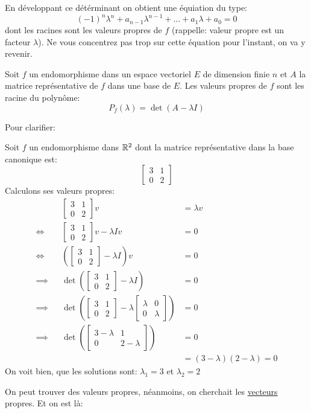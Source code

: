 En développant ce détérminant on obtient une équiation du type:
\[
    (-1)^n\lambda^n + a_{n-1}\lambda^{n-1} + \ldots + a_1\lambda + a_0 = 0
\] 
dont les racines sont les valeurs propres de $f$ (rappelle: valeur propre est un facteur $\lambda$).
Ne vous concentrez pas trop sur cette équation pour l'instant, on va y revenir.
\begin{prop}
   Soit $f$ un endomorphisme dans un espace vectoriel  $E$ de dimension finie  $n$ et $A$ la matrice représentative de  $f$ dans une base de  $E$. Les valeurs propres de  $f$ sont les racine du polynôme:
   \[
   P_f(\lambda) = \det(A - \lambda I)
   \] 
\end{prop}
Pour clarifier:
\begin{eg}
   Soit $f$ un endomorphisme dans  $\mathbb{R}^2$ dont la matrice représentative dans la base canonique est:
   \[
       \begin{bmatrix} 3 & 1\\ 0 & 2 \end{bmatrix} 
   \] 
   Calculons ses valeurs propres:
   \begin{align*}
       && \begin{bmatrix} 3 & 1\\ 0 & 2 \end{bmatrix} v &= \lambda v \\
       \iff && \begin{bmatrix} 3 & 1\\ 0 & 2 \end{bmatrix} v - \lambda I v &= 0\\
       \iff && \left(\begin{bmatrix} 3 & 1\\ 0 & 2 \end{bmatrix}  - \lambda I\right)v  &= 0\\
       \implies && \det \left( \begin{bmatrix} 3 & 1\\ 0 & 2 \end{bmatrix}  - \lambda I \right) &= 0\\
       \implies && \det \left( \begin{bmatrix} 3 & 1\\ 0 & 2 \end{bmatrix}  - \lambda \begin{bmatrix} \lambda & 0\\ 0 & \lambda \end{bmatrix}  \right) &= 0\\
       \implies && \det \left( \begin{bmatrix} 3 - \lambda & 1\\ 0 & 2 - \lambda \end{bmatrix}\right) &= 0\\
                && &= (3-\lambda)(2 - \lambda) = 0
   \end{align*}
   On voit bien, que les solutions sont: $\lambda_1 = 3$ et  $\lambda_2 = 2$
\end{eg}
On peut trouver des valeurs propres, néanmoins, on cherchait les \underline{vecteurs} propres. Et on est là:
